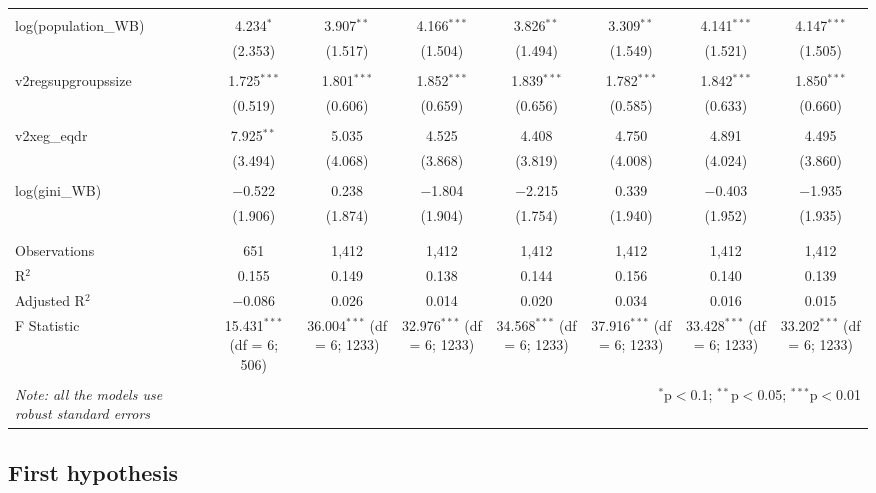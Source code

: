 \documentclass[a4paper, 12pt]{article}
\begin{document}
\begin{table}[!htbp]
{\begin{tabular}{@{\extracolsep{5pt}}lccccccc}
  & & & & & & & \\ 
 log(population\_WB) & 4.234$^{*}$ & 3.907$^{**}$ & 4.166$^{***}$ & 3.826$^{**}$ & 3.309$^{**}$ & 4.141$^{***}$ & 4.147$^{***}$ \\ 
  & (2.353) & (1.517) & (1.504) & (1.494) & (1.549) & (1.521) & (1.505) \\ 
  & & & & & & & \\ 
 v2regsupgroupssize & 1.725$^{***}$ & 1.801$^{***}$ & 1.852$^{***}$ & 1.839$^{***}$ & 1.782$^{***}$ & 1.842$^{***}$ & 1.850$^{***}$ \\ 
  & (0.519) & (0.606) & (0.659) & (0.656) & (0.585) & (0.633) & (0.660) \\ 
  & & & & & & & \\ 
 v2xeg\_eqdr & 7.925$^{**}$ & 5.035 & 4.525 & 4.408 & 4.750 & 4.891 & 4.495 \\ 
  & (3.494) & (4.068) & (3.868) & (3.819) & (4.008) & (4.024) & (3.860) \\ 
  & & & & & & & \\ 
 log(gini\_WB) & $-$0.522 & 0.238 & $-$1.804 & $-$2.215 & 0.339 & $-$0.403 & $-$1.935 \\ 
  & (1.906) & (1.874) & (1.904) & (1.754) & (1.940) & (1.952) & (1.935) \\ 
  & & & & & & & \\ 
\hline \\[-1.8ex] 
Observations & 651 & 1,412 & 1,412 & 1,412 & 1,412 & 1,412 & 1,412 \\ 
R$^{2}$ & 0.155 & 0.149 & 0.138 & 0.144 & 0.156 & 0.140 & 0.139 \\ 
Adjusted R$^{2}$ & $-$0.086 & 0.026 & 0.014 & 0.020 & 0.034 & 0.016 & 0.015 \\ 
F Statistic & 15.431$^{***}$ (df = 6; 506) & 36.004$^{***}$ (df = 6; 1233) & 32.976$^{***}$ (df = 6; 1233) & 34.568$^{***}$ (df = 6; 1233) & 37.916$^{***}$ (df = 6; 1233) & 33.428$^{***}$ (df = 6; 1233) & 33.202$^{***}$ (df = 6; 1233) \\ 
\hline 
\hline \\[-1.8ex] 
\textit{Note: all the models use robust standard errors}  & \multicolumn{7}{r}{$^{*}$p$<$0.1; $^{**}$p$<$0.05; $^{***}$p$<$0.01} \\ 
\end{tabular} }
\end{table} 


    
    \subsection{First hypothesis}
    
\end{document}
